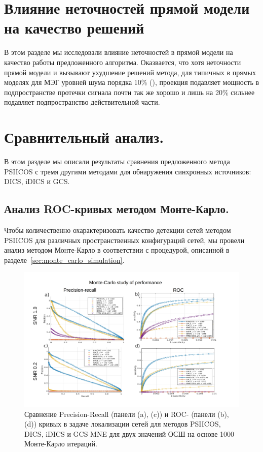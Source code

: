 \section{Влияние неточностей прямой модели на качество решений}\label{sec:forward_model_errors_effect}

В этом разделе мы исследовали влияние неточностей в прямой модели на качество
работы предложенного алгоритма. Оказвается, что хотя неточности прямой модели и
вызывают ухудшение решений метода, для типичных в прямых моделях для МЭГ
уровней шума порядка 10\% (\cite{Mosher1999}), проекция подавляет мощность в
подпространстве протечки сигнала почти так же хорошо и лишь на 20\% сильнее
подавляет подпространство действительной части.

\section{Сравнительный анализ.}

 В этом разделе мы описали результаты сравнения предложенного метода PSIICOS
 с тремя другими методами для обнаружения синхронных источников: DICS, iDICS и GCS.\@

\subsection{Анализ ROC-кривых методом Монте-Карло.}
Чтобы количественно охарактеризовать качество детекции сетей методом PSIICOS для различных
пространственных конфигураций сетей, мы провели анализ методом Монте-Карло в соответствии
с процедурой, описанной в разделе~\ref{sec:monte_carlo_simulation}.

 \begin{figure}[!ht]
 \includegraphics[width=1\textwidth]{../images/psiicos_paper/Figure4_hr_labelled_pans.jpg}
 \caption{Сравнение Precision-Recall (панели (a), (c))  и ROC- (панели (b), (d)) кривых
     в задаче локализации сетей для методов PSIICOS, DICS, iDICS и GCS MNE для
     двух значений ОСШ на основе 1000 Монте-Карло итераций.}\label{fig:04} %
\end{figure}%

